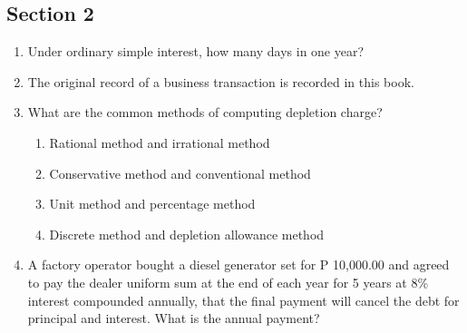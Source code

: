 \documentclass[11pt,a4paper]{article}
\begin{document}
\subsection*{Section 2}
\begin{enumerate}
\item{Under ordinary simple interest, how many days in one year?}
\\
\item{The original record of a business transaction is recorded in this book.}
\\
\item{What are the common methods of computing depletion charge?}
\begin{enumerate}[label=\Alph*.]
\item{Rational method and irrational method}
\item{Conservative method and conventional method}
\item{Unit method and percentage method}
\item{Discrete method and depletion allowance method}
\end{enumerate}
\item{A factory operator bought a diesel generator set for P 10,000.00 and agreed to pay the dealer uniform sum at the end of each year for 5 years at 8\% interest compounded annually, that the final payment will cancel the debt for principal and interest. What is the annual payment?}
\\

\end{enumerate}
\end{document}
